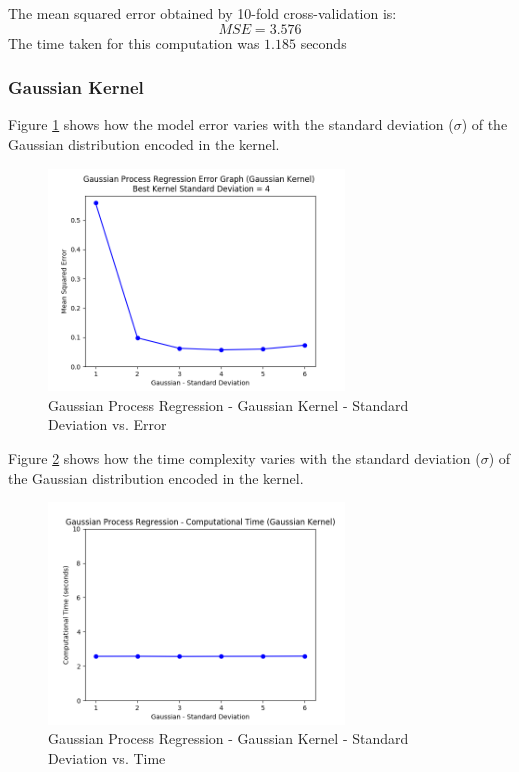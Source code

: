 \documentclass[parskip=full]{scrartcl}
\begin{document}
        The mean squared error obtained by 10-fold cross-validation is:
        $$MSE = 3.576$$
        The time taken for this computation was $1.185$ seconds
        

        \subsubsection*{Gaussian Kernel} %
        \label{ssub:gaussian_kernel}

            Figure \ref{fig:gpr_gaussian_stddev_vs_error} shows how the model error varies with the standard deviation ($\sigma$) of the Gaussian distribution encoded in the kernel.

            \begin{figure}
                \centering
                \includegraphics[width=0.7\textwidth]{3c_gpr_gaussian_stddev_vs_error.png}
                \caption{Gaussian Process Regression - Gaussian Kernel - Standard Deviation vs. Error}
                \label{fig:gpr_gaussian_stddev_vs_error}
            \end{figure}

            Figure \ref{fig:gpr_gaussian_stddev_vs_time} shows how the time complexity varies with the standard deviation ($\sigma$) of the Gaussian distribution encoded in the kernel.

            \begin{figure}
                \centering
                \includegraphics[width=0.7\textwidth]{3c_gpr_gaussian_stddev_vs_time.png}
                \caption{Gaussian Process Regression - Gaussian Kernel - Standard Deviation vs. Time}
                \label{fig:gpr_gaussian_stddev_vs_time}
            \end{figure}
        
\end{document}
